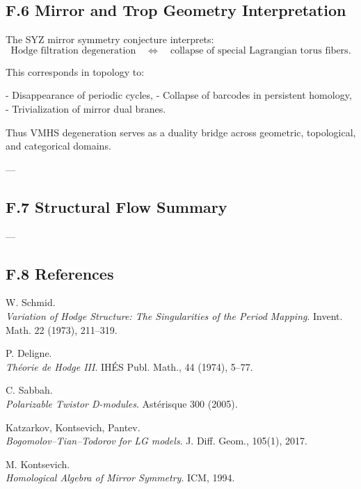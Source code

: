 \documentclass[11pt]{article}
\begin{document}
\subsection*{F.6 Mirror and Trop Geometry Interpretation}

The SYZ mirror symmetry conjecture interprets:
\[
\text{Hodge filtration degeneration}
\quad \Leftrightarrow \quad
\text{collapse of special Lagrangian torus fibers}.
\]

This corresponds in topology to:

- Disappearance of periodic cycles,
- Collapse of barcodes in persistent homology,
- Trivialization of mirror dual branes.

Thus VMHS degeneration serves as a duality bridge across geometric, topological, and categorical domains.

---

\subsection*{F.7 Structural Flow Summary}

\begin{center}
\end{center}

---

\subsection*{F.8 References}

\begin{thebibliography}{9}

W. Schmid.\\
\textit{Variation of Hodge Structure: The Singularities of the Period Mapping}.  
Invent. Math. 22 (1973), 211–319.

P. Deligne.\\
\textit{Théorie de Hodge III}.  
IHÉS Publ. Math., 44 (1974), 5–77.

C. Sabbah.\\
\textit{Polarizable Twistor D-modules}.  
Astérisque 300 (2005).

Katzarkov, Kontsevich, Pantev.\\
\textit{Bogomolov–Tian–Todorov for LG models}.  
J. Diff. Geom., 105(1), 2017.

M. Kontsevich.\\
\textit{Homological Algebra of Mirror Symmetry}.  
ICM, 1994.

\end{thebibliography}
\end{document}
